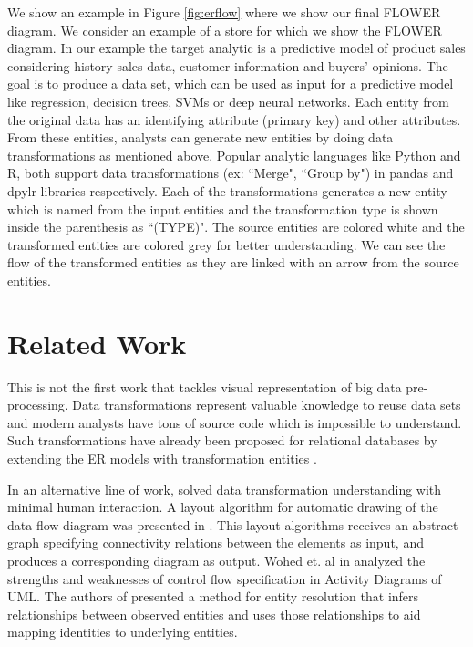 \documentclass[sigconf,edbt]{acmart-edbt-workshops}
\newcommand{\+}{\discretionary{\mbox{${\bm\cdot}\mkern-1mu$}}{}{}}
\begin{document}
We show an example in Figure \ref{fig:erflow} where we show our final FLOWER diagram. 
We consider an example of a store for which we show the FLOWER diagram. 
In our example the target analytic is a predictive model of product sales
considering history sales data, customer information and buyers' opinions.
The goal is to produce a data set, which can be used as input for 
a predictive model like regression, decision trees, SVMs or deep neural networks.
Each entity from the original data has an identifying attribute (primary key) and other attributes.
From these entities, analysts can generate new entities by doing data transformations as mentioned above.
Popular analytic languages like Python and R, both support data transformations (ex: ``Merge", ``Group by") in pandas and dpylr libraries respectively.
Each of the transformations generates a new entity which is named from the input entities and the transformation type is shown inside the parenthesis as ``(TYPE)".
The source entities are colored white and the transformed entities are colored grey for better understanding.
We can see the flow of the transformed entities as they are linked with an arrow from the source entities.

\begin{comment}
 experimental evaluation?
 measure abstraction, ease of use, size
 speed does nort make sense
 correctness does not make sense as there is no reference
\end{comment} 


\section{Related Work}

This is not the first work that tackles visual representation of big data pre-processing.
Data transformations represent valuable knowledge to reuse data sets
and
modern analysts have tons of source code which is impossible to understand.
Such transformations have already been proposed for relational databases 
by extending the ER models with transformation entities \cite{LOBK2019,OMMC2013}.

In an alternative line of work, 
\cite{PKJ2019} solved data transformation understanding with minimal human interaction.
A layout algorithm for automatic drawing of the data flow diagram was presented in \cite{BNT1986}.
This layout algorithms receives an abstract graph specifying connectivity relations between the elements as input, and produces a corresponding diagram as output.
Wohed et. al in \cite{WADHR2005} analyzed the strengths and weaknesses of control flow specification in Activity Diagrams of UML.
The authors of \cite{MCHM2014} presented a method for entity resolution that infers relationships between observed entities and uses those relationships to aid mapping identities to underlying entities.
\end{document}
